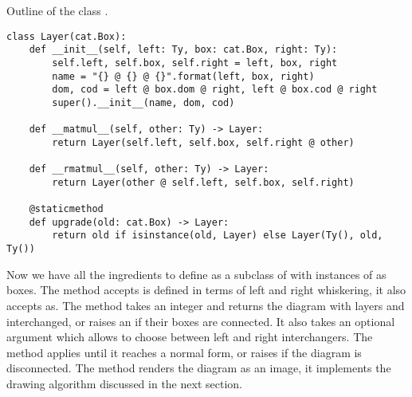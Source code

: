 \begin{python}\label{listing:Layer}
{\normalfont Outline of the class .}
\begin{verbatim}
class Layer(cat.Box):
    def __init__(self, left: Ty, box: cat.Box, right: Ty):
        self.left, self.box, self.right = left, box, right
        name = "{} @ {} @ {}".format(left, box, right)
        dom, cod = left @ box.dom @ right, left @ box.cod @ right
        super().__init__(name, dom, cod)

    def __matmul__(self, other: Ty) -> Layer:
        return Layer(self.left, self.box, self.right @ other)

    def __rmatmul__(self, other: Ty) -> Layer:
        return Layer(other @ self.left, self.box, self.right)

    @staticmethod
    def upgrade(old: cat.Box) -> Layer:
        return old if isinstance(old, Layer) else Layer(Ty(), old, Ty())
\end{verbatim}
\end{python}

Now we have all the ingredients to define  as a subclass of  with instances of  as boxes.
The  method accepts is defined in terms of left and right whiskering, it also accepts  as.
The  method takes an integer  and returns the diagram with layers  and  interchanged, or raises an  if their boxes are connected.
It also takes an optional argument  which allows to choose between left and right interchangers.
The  method applies  until it reaches a normal form, or raises  if the diagram is disconnected.
The  method renders the diagram as an image, it implements the drawing algorithm discussed in the next section.


